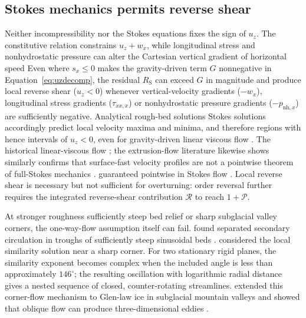 \documentclass[review]{igs}
\providecommand{\DIFadd}[1]{{\protect\color{blue} \sf #1}} %
\providecommand{\DIFdel}[1]{{\protect\color{red} \scriptsize #1}} %
\providecommand{\DIFaddbegin}{} %
\providecommand{\DIFaddend}{} %
\providecommand{\DIFdelbegin}{} %
\providecommand{\DIFdelend}{} %
\newcommand{\DIFscaledelfig}{0.5}
\newlength{\DIFdelgraphicswidth} %
\newlength{\DIFdelgraphicsheight} %
\newcommand{\DIFaddincludegraphics}[2][]{{\color{blue}\fbox{\DIFOincludegraphics[#1]{#2}}}} %
\newcommand{\DIFdelincludegraphics}[2][]{%
\sbox{\DIFdelgraphicsbox}{\DIFOincludegraphics[#1]{#2}}%
\settoboxwidth{\DIFdelgraphicswidth}{\DIFdelgraphicsbox} %
\settoboxtotalheight{\DIFdelgraphicsheight}{\DIFdelgraphicsbox} %
\scalebox{\DIFscaledelfig}{%
\parbox[b]{\DIFdelgraphicswidth}{\usebox{\DIFdelgraphicsbox}\\[-\baselineskip] \rule{\DIFdelgraphicswidth}{0em}}\llap{\resizebox{\DIFdelgraphicswidth}{\DIFdelgraphicsheight}{%
\setlength{\unitlength}{\DIFdelgraphicswidth}%
\begin{picture}(1,1)%
\thicklines\linethickness{2pt} %
{\color[rgb]{1,0,0}\put(0,0){\framebox(1,1){}}}%
{\color[rgb]{1,0,0}\put(0,0){\line( 1,1){1}}}%
{\color[rgb]{1,0,0}\put(0,1){\line(1,-1){1}}}%
\end{picture}%
}\hspace*{3pt}}} %
} %
\DeclareRobustCommand{\DIFaddbegin}{\DIFOaddbegin \let\includegraphics\DIFaddincludegraphics} %
\DeclareRobustCommand{\DIFaddend}{\DIFOaddend \let\includegraphics\DIFOincludegraphics} %
\DeclareRobustCommand{\DIFdelbegin}{\DIFOdelbegin \let\includegraphics\DIFdelincludegraphics} %
\DeclareRobustCommand{\DIFdelend}{\DIFOaddend \let\includegraphics\DIFOincludegraphics} %
\begin{document}
\DIFdelbegin %
\DIFdelend \DIFaddbegin \subsection{Stokes mechanics permits reverse shear}
\DIFaddend 

Neither incompressibility nor the Stokes equations fixes the sign of \(u_z\). \DIFdelbegin \DIFdel{The constitutive relation constrains \(u_z+w_x\), while longitudinal stress and nonhydrostatic pressure can alter the Cartesian vertical gradient of horizontal speed}\DIFdelend \DIFaddbegin \DIFadd{Even where \(s_x\leq0\) makes the gravity-driven term \(G\) nonnegative in Equation~\ref{eq:uzdecomp}, the residual \(R_{\mathrm{S}}\) can exceed \(G\) in magnitude and produce local reverse shear (\(u_z<0\)) whenever vertical-velocity gradients (\(-w_x\)), longitudinal stress gradients (\(\tau_{xx,x}\)) or nonhydrostatic pressure gradients (\(-p_{\mathrm{nh},x}\)) are sufficiently negative}\DIFaddend . Analytical rough-bed \DIFdelbegin \DIFdel{solutions }\DIFdelend \DIFaddbegin \DIFadd{Stokes solutions accordingly }\DIFaddend predict local velocity maxima and minima, and \DIFdelbegin \DIFdel{therefore regions with }\DIFdelend \DIFaddbegin \DIFadd{hence intervals of }\DIFaddend \(u_z<0\), even for gravity-driven \DIFdelbegin \DIFdel{linear viscous flow \citep{Gudmundsson1997linear}. The historical }\DIFdelend \DIFaddbegin \DIFadd{linear-viscous flow \citep{Gudmundsson1997linear}; the }\DIFaddend extrusion-flow literature \DIFdelbegin \DIFdel{likewise shows }\DIFdelend \DIFaddbegin \DIFadd{similarly confirms }\DIFaddend that surface-fast velocity profiles are not \DIFdelbegin \DIFdel{a pointwise theorem of full-Stokes mechanics \citep{Waddington2010}. }\DIFdelend \DIFaddbegin \DIFadd{guaranteed pointwise in Stokes flow \citep{Waddington2010}. Local reverse shear is necessary but not sufficient for overturning: order reversal further requires the integrated reverse-shear contribution \(\mathcal{R}\) to reach \(1+\mathcal{P}\).
}\DIFaddend 

At \DIFdelbegin \DIFdel{stronger roughness}\DIFdelend \DIFaddbegin \DIFadd{sufficiently steep bed relief or sharp subglacial valley corners}\DIFaddend , the one-way-flow assumption \DIFdelbegin \DIFdel{itself can fail. \citet{Gudmundsson1997nonlinear} found separated secondary circulation in troughs of sufficiently steep sinusoidal beds . \citet{Moffatt1964} considered the local similarity solution near a sharp corner. For two stationary rigid planes, the similarity exponent becomes complex when the included angle is less than approximately \(146^{\circ}\); the resulting oscillation with logarithmic radial distance gives a nested sequence of closed, counter-rotating streamlines. \citet{MeyerCreyts2017} extended this corner-flow mechanism to Glen-law ice in subglacial mountain valleys and showed that oblique flow can produce three-dimensional eddies .
}%
\end{document}
